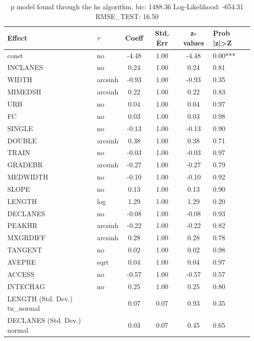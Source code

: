 \begin{table}
	\caption{p model found through the hs algorithm. bic: 1488.36 Log-Likelihood: -654.31 RMSE_TEST: 16.50}
	\begin{center}
		\begin{tabular}{|l|l|c|c|c|l|}
			\hline
			Effect & $\tau$ & Coeff & Std. Err & z-values & Prob |z|>Z \\
			\hline
			const & no & -4.48 & 1.00 & -4.48 & 0.00*** \\
			\hline
			INCLANES & no & 0.24 & 1.00 & 0.24 & 0.81 \\
			\hline
			WIDTH & arcsinh & -0.93 & 1.00 & -0.93 & 0.35 \\
			\hline
			MIMEDSH & arcsinh & 0.22 & 1.00 & 0.22 & 0.83 \\
			\hline
			URB & no & 0.04 & 1.00 & 0.04 & 0.97 \\
			\hline
			FC & no & 0.03 & 1.00 & 0.03 & 0.98 \\
			\hline
			SINGLE & no & -0.13 & 1.00 & -0.13 & 0.90 \\
			\hline
			DOUBLE & arcsinh & 0.38 & 1.00 & 0.38 & 0.71 \\
			\hline
			TRAIN & no & -0.03 & 1.00 & -0.03 & 0.97 \\
			\hline
			GRADEBR & arcsinh & -0.27 & 1.00 & -0.27 & 0.79 \\
			\hline
			MEDWIDTH & no & -0.10 & 1.00 & -0.10 & 0.92 \\
			\hline
			SLOPE & no & 0.13 & 1.00 & 0.13 & 0.90 \\
			\hline
			LENGTH & log & 1.29 & 1.00 & 1.29 & 0.20 \\
			\hline
			DECLANES & no & -0.08 & 1.00 & -0.08 & 0.93 \\
			\hline
			PEAKHR & arcsinh & -0.22 & 1.00 & -0.22 & 0.82 \\
			\hline
			MXGRDIFF & arcsinh & 0.28 & 1.00 & 0.28 & 0.78 \\
			\hline
			TANGENT & no & 0.02 & 1.00 & 0.02 & 0.98 \\
			\hline
			AVEPRE & sqrt & 0.04 & 1.00 & 0.04 & 0.97 \\
			\hline
			ACCESS & no & -0.57 & 1.00 & -0.57 & 0.57 \\
			\hline
			INTECHAG & no & 0.25 & 1.00 & 0.25 & 0.80 \\
			\hline
			LENGTH (Std. Dev.) tn_normal &  & 0.07 & 0.07 & 0.93 & 0.35 \\
			\hline
			DECLANES (Std. Dev.) normal &  & 0.03 & 0.07 & 0.45 & 0.65 \\

\end{tabular}
\end{center}
\end{table}
